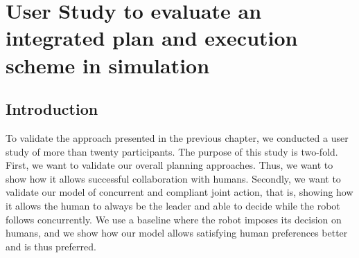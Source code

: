 \cleardoublepage

\ifdefined{}
\else
\setcounter{chapter}{5} 
\dominitoc
\faketableofcontents
\fi

\chapter{User Study to evaluate an integrated plan and execution scheme in simulation}
\label{chap:6}
\minitoc


\section{Introduction}

To validate the approach presented in the previous chapter, we conducted a user study of more than twenty participants. The purpose of this study is two-fold. 
First, we want to validate our overall planning approaches. Thus, we want to show how it allows successful collaboration with humans. 
Secondly, we want to validate our model of concurrent and compliant joint action, that is, showing how it allows the human to always be the leader and able to decide while the robot follows concurrently. We use a baseline where the robot imposes its decision on humans, and we show how our model allows satisfying human preferences better and is thus preferred. 

